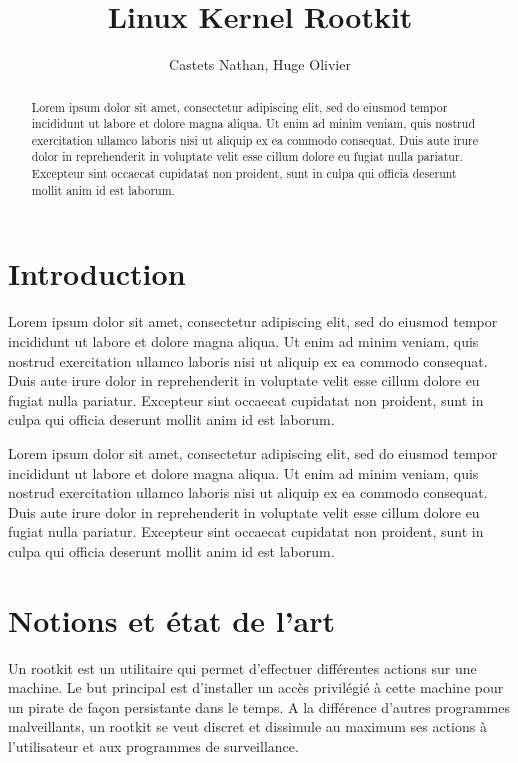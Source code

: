 \documentclass[journal, a4paper]{IEEEtran}
\begin{document}
	\title{Linux Kernel Rootkit}
	\author{Castets Nathan, Huge Olivier}
	\maketitle

\begin{abstract}
	Lorem ipsum dolor sit amet, consectetur adipiscing elit, sed do eiusmod tempor incididunt ut labore et dolore magna aliqua. Ut enim ad minim veniam, quis nostrud exercitation ullamco laboris nisi ut aliquip ex ea commodo consequat. Duis aute irure dolor in reprehenderit in voluptate velit esse cillum dolore eu fugiat nulla pariatur. Excepteur sint occaecat cupidatat non proident, sunt in culpa qui officia deserunt mollit anim id est laborum.
\end{abstract}

\section{Introduction}

Lorem ipsum dolor sit amet, consectetur adipiscing elit, sed do eiusmod tempor incididunt ut labore et dolore magna aliqua. Ut enim ad minim veniam, quis nostrud exercitation ullamco laboris nisi ut aliquip ex ea commodo consequat. Duis aute irure dolor in reprehenderit in voluptate velit esse cillum dolore eu fugiat nulla pariatur. Excepteur sint occaecat cupidatat non proident, sunt in culpa qui officia deserunt mollit anim id est laborum.

Lorem ipsum dolor sit amet, consectetur adipiscing elit, sed do eiusmod tempor incididunt ut labore et dolore magna aliqua. Ut enim ad minim veniam, quis nostrud exercitation ullamco laboris nisi ut aliquip ex ea commodo consequat. Duis aute irure dolor in reprehenderit in voluptate velit esse cillum dolore eu fugiat nulla pariatur. Excepteur sint occaecat cupidatat non proident, sunt in culpa qui officia deserunt mollit anim id est laborum.

\section{Notions et état de l'art}

Un rootkit est un utilitaire qui permet d'effectuer différentes actions sur une machine. Le but principal est d'installer un accès privilégié à cette machine pour un pirate de façon persistante dans le temps. A la différence d'autres programmes malveillants, un rootkit se veut discret et dissimule au maximum ses actions à l'utilisateur et aux programmes de surveillance.
\end{document}
